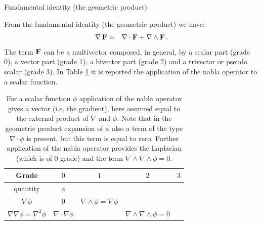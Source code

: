 \documentclass[handout,10pt]{beamer}
\begin{document}
\begin{frame}[shrink=00]{Fundamental identity (the geometric product)}

From the fundamental identity (the geometric product) we have:
%
\begin{eqnarray}
 \nabla \, {\bf F}  & = &   \nabla \cdot \mathbf{F} + \nabla \wedge \mathbf{F}   \, .
\end{eqnarray}
%
The term $\mathbf{F}$ can be a multivector composed, in general, by a scalar part (grade 0), a vector part (grade 1), a bivector part (grade 2) and a trivector or pseudo scalar (grade 3). 
In Table \ref{nabla_scalar} it  is reported the application of the nabla operator to a scalar function.


\begin{table}[]
\centering
\caption{ For a scalar function $\phi$ application of the nabla operator gives a vector  (i.e. the gradient), here assumed equal to the external product of $\nabla$ and $\phi$. Note that in the geometric product expansion of $\phi$ also a term of the type $\nabla \cdot \phi$ is present, but this term is equal to zero.
Further application of the nabla operator provides the Laplacian (which is of 0 grade) and the term $\nabla \wedge \nabla \wedge \phi =0$.}
\label{nabla_scalar}
\begin{tabular}{| c | c | c | c | c |}
%
\hline
Grade & $0$ & $1$  & $2$ & $3$ \\
\hline
quantity & $\phi$ &   &  &  \\ \hline
$\nabla \phi$ & 0 &  $\nabla \wedge \phi = \nabla \phi$ &  &  \\ \hline
$\nabla \nabla \phi= \nabla^2 \phi$ & $\nabla \cdot \nabla \phi$ &   & $\nabla \wedge \nabla \wedge \phi =0$ &  \\ \hline
\end{tabular}
\end{table}




\end{frame}
\end{document}
